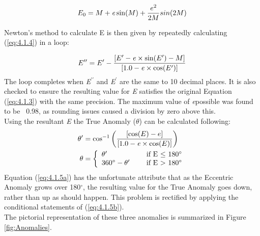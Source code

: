 \documentclass[12pt,preprint]{aastex}
\begin{document}
\begin{equation}\label{eq:4.1.3.5}
E_0 = M+{\it e}\sin(M) + \frac{e^2}{2M}sin(2M)
\end{equation}

Newton's method to calculate E is then given by repeatedly calculating (\ref{eq:4.1.4}) in a loop:
  
\begin{equation}\label{eq:4.1.4}
E^{\prime \prime} = E^{\prime} - \frac{[E^{\prime} - {\it e} \times \sin(E^{\prime}) - M]}{[1.0 - {\it e} \times \cos(E^{\prime})]}
\end{equation}
The loop completes when {\it E$^{\prime \prime}$} and {\it E$^{\prime}$} are the same to 10 decimal places.  It is also checked to ensure the resulting value for {\it E} satisfies the original Equation (\ref{eq:4.1.3}) with the same precision.  The maximum value of {\it e}possible was found to be ~0.98, as rounding issues caused a division by zero above this.\\

Using the resultant {\it E} the True Anomaly ($\theta$) can be calculated following:
\begin{subequations}
\begin{align}
\label{eq:4.1.5a}
\theta^{\prime}& = \cos^{-1} \bigg( \frac{[\cos(E) - e]}{[1.0 -{\it e}\times \cos(E)]} \bigg)\\
\label{eq:4.1.5b}
\theta& = \left\{ \begin{array}{l l} \theta^{\prime}& \quad \text{ if E $\leq$ 180$^{\circ}$}\\ 360^{\circ}  - \theta^{\prime}& \quad \text{ if E $>$ 180$^{\circ}$} \end{array}\right.
\end{align}
\end{subequations}
Equation (\ref{eq:4.1.5a}) has the unfortunate attribute that as the Eccentric Anomaly grows over 180$^{\circ}$, the resulting value for the True Anomaly goes down, rather than up as should happen.  This problem is rectified by applying the conditional statements of (\ref{eq:4.1.5b}).\\  

The pictorial representation of these three anomalies is summarized in Figure \ref{fig:Anomalies}.
\end{document}
